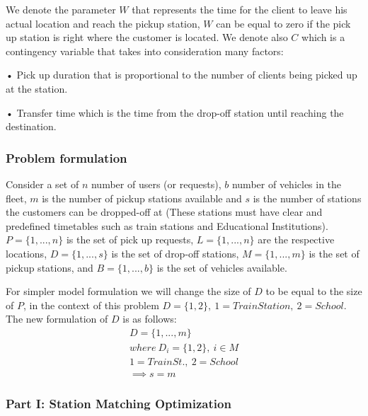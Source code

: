 \documentclass{article}
\begin{document}
We denote the parameter $W$ that represents the time for the client to leave his actual location and reach the pickup station, $W$ can be equal to zero if the pick up station is right where the 
customer is located. We denote also $C$ which is a contingency variable that takes into consideration many factors: \\
\begin{list}{}
\item •  Pick up duration that is proportional to the number of clients being picked up at the station.
\item •  Transfer time which is the time from the drop-off station until reaching the destination.
\end{list} 



\subsubsection*{Problem formulation}


Consider a set of $n$ number of users (or requests), $b$ number of vehicles in the fleet, $m$ is the number of pickup stations available and $s$ is the number of stations the customers can be dropped-off at (These stations must have clear and predefined timetables such as train stations and Educational Institutions). $P = \{ 1, ..., n \}$ is the set of pick up requests, $L = \{ 1, ..., n \}$ are the respective locations, $D =  \{ 1, ..., s \}$ is the set of drop-off stations,  $M =  \{ 1, ..., m \}$ is the set of pickup stations, and $B =  \{ 1, ..., b \}$ is the set of vehicles available.

For simpler model formulation we will change the size of $D$ to be equal to the size of $P$, in the context of this problem $D = \{1,2\},\ 1 = Train Station,\ 2 = School$. The new formulation of $D$ is as follows:
\begin{equation*}
\begin{array}{l}
D = \{1, ..., m\}\\
where\ D_i = \{1,2\}, \ i \in M \\
1 = Train St.,\ 2 = School \\
 \implies s = m 
\end{array}
\end{equation*}

\subsubsection{Part I: Station Matching Optimization}
\label{sebsec:st_alloc}
\end{document}
